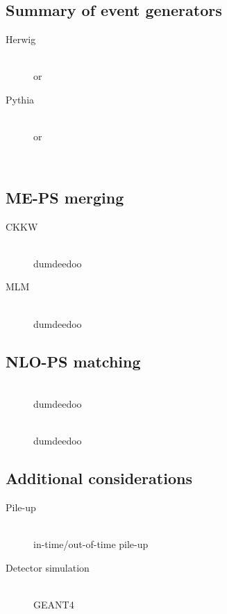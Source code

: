 \subsection{Summary of event generators}
\begin{description}
\item[Herwig] \hfill \\
	\fherwig or \herwigpp \cpp
\item[Pythia] \hfill \\
	 or 
\item[\sherpa] \hfill \\
	\sherpa
\end{description}

\subsection{ME-PS merging}
\label{sec:mc:merging}

\begin{description}
\item[CKKW] \hfill \\
	dumdeedoo
\item[MLM] \hfill \\
	dumdeedoo
\end{description}

\subsection{NLO-PS matching}
\label{sec:mc:matching}

\begin{description}
\item[\mcatnlo] \hfill \\
	dumdeedoo
\item[\powheg] \hfill \\
	dumdeedoo
\end{description}

\subsection{Additional considerations}
\begin{description}
\item[Pile-up] \hfill \\
	in-time/out-of-time pile-up
\item[Detector simulation] \hfill \\
	GEANT4
\end{description}